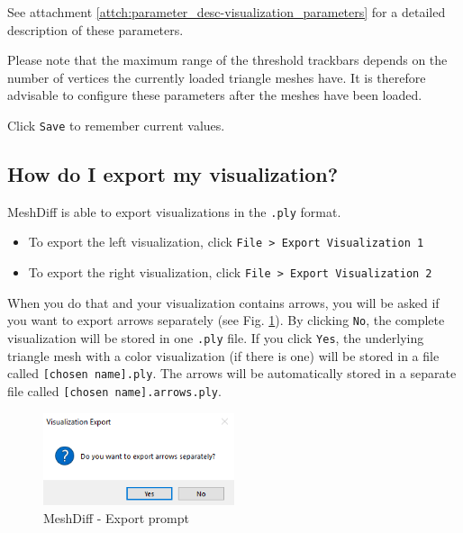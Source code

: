 See attachment \ref{attch:parameter_desc-visualization_parameters} for a detailed description of these parameters.

Please note that the maximum range of the threshold trackbars depends on the number of vertices the currently loaded triangle meshes have. It is therefore advisable to configure these parameters after the meshes have been loaded.

Click \verb+Save+ to remember current values.

\subsection{How do I export my visualization?}
\label{attch:user_doc-export_vis}

MeshDiff is able to export visualizations in the \verb+.ply+ format.

\begin{itemize}
\item To export the left visualization, click \verb+File > Export Visualization 1+
\item To export the right visualization, click \verb+File > Export Visualization 2+
\end{itemize}

When you do that and your visualization contains arrows, you will be asked if you want to export arrows separately (see Fig. \ref{fig:meshdiff-separate_arrows_prompt}). By clicking \verb+No+, the complete visualization will be stored in one \verb+.ply+ file. If you click \verb+Yes+, the underlying triangle mesh with a color visualization (if there is one) will be stored in a file called \verb+[chosen name].ply+. The arrows will be automatically stored in a separate file called \verb+[chosen name].arrows.ply+.

\begin{figure}[h]
\centering
\includegraphics[width=0.5\textwidth]{./img/meshdiff-separate_arrows.PNG}
\caption[MeshDiff - Export prompt]{MeshDiff - Export prompt}
\label{fig:meshdiff-separate_arrows_prompt}
\end{figure}


